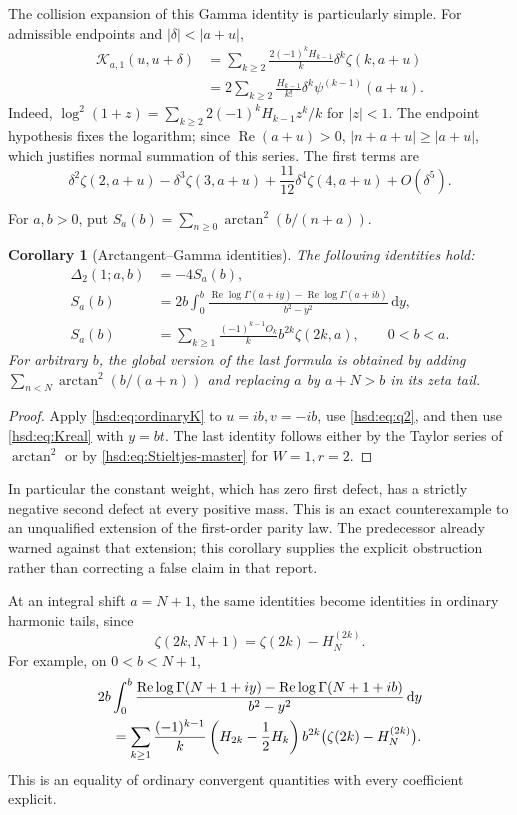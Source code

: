 \documentclass[11pt]{article}
\numberwithin{equation}{section}
\newtheorem{corollary}[theorem]{Corollary}
\theoremstyle{definition}\newtheorem{definition}[theorem]{Definition}
\theoremstyle{remark}\newtheorem{remark}[theorem]{Remark}
\DeclareMathOperator{\Rea}{Re}
\newcommand{\dd}{\,\mathrm d}
\newcommand{\KK}{\mathcal K}
\begin{document}
The collision expansion of this Gamma identity is particularly simple.
For admissible endpoints and $|\delta|<|a+u|$,
\begin{align}
 \KK_{a,1}(u,u+\delta)
 &=\sum_{k\ge2}\frac{2(-1)^kH_{k-1}}k\delta^k\zeta(k,a+u)
 \label{hsd:eq:scalar-collision-zeta}\\
 &=2\sum_{k\ge2}\frac{H_{k-1}}{k!}\delta^k\psi^{(k-1)}(a+u).
 \label{hsd:eq:scalar-collision-psi}
\end{align}
Indeed,
$\log^2(1+z)=\sum_{k\ge2}2(-1)^kH_{k-1}z^k/k$ for $|z|<1$.
The endpoint hypothesis fixes the logarithm; since $\Rea(a+u)>0$,
$|n+a+u|\ge|a+u|$, which justifies normal summation of this series.
The first terms are
\[
 \delta^2\zeta(2,a+u)-\delta^3\zeta(3,a+u)
                     +\frac{11}{12}\delta^4\zeta(4,a+u)+O(\delta^5).
\]

For $a,b>0$, put $S_a(b)=\sum_{n\ge0}\arctan^2(b/(n+a))$.
\begin{corollary}[Arctangent--Gamma identities]
\label{hsd:cor:atan}
The following identities hold:
\begin{align}
 \Delta_2(1;a,b)&=-4S_a(b),\label{hsd:eq:scalar-defect}\\
 S_a(b)&=2b\int_0^b
 \frac{\Rea\log\Gamma(a+iy)-\Rea\log\Gamma(a+ib)}{b^2-y^2}\dd y,
 \label{hsd:eq:atan-gamma}\\
 S_a(b)&=\sum_{k\ge1}\frac{(-1)^{k-1}O_k}{k}
                         b^{2k}\zeta(2k,a),\qquad 0<b<a.
 \label{hsd:eq:atan-harmonic}
\end{align}
For arbitrary $b$, the global version of the last formula is obtained by
adding $\sum_{n<N}\arctan^2(b/(a+n))$ and replacing $a$ by $a+N>b$
in its zeta tail.
\end{corollary}
\begin{proof}
Apply \eqref{hsd:eq:ordinaryK} to $u=ib,v=-ib$, use
\eqref{hsd:eq:q2}, and then use \eqref{hsd:eq:Kreal} with $y=bt$.
The last identity follows either by the Taylor series of $\arctan^2$
or by \eqref{hsd:eq:Stieltjes-master} for $W=1,r=2$.
\end{proof}

In particular the constant weight, which has zero first defect, has a
strictly negative second defect at every positive mass. This is an exact
counterexample to an unqualified extension of the first-order parity law.
The predecessor already warned against that extension; this corollary
supplies the explicit obstruction rather than correcting a false claim
in that report.

At an integral shift $a=N+1$, the same identities become identities in
ordinary harmonic tails, since
\[
 \zeta(2k,N+1)=\zeta(2k)-H_N^{(2k)}.
\]
For example, on $0<b<N+1$,
\begin{align}
 &2b\int_0^b\frac{\Rea\log\Gamma(N+1+iy)
              -\Rea\log\Gamma(N+1+ib)}{b^2-y^2}\dd y\notag\\
 &\quad=\sum_{k\ge1}\frac{(-1)^{k-1}}k
  \left(H_{2k}-\frac12H_k\right)b^{2k}
                     \bigl(\zeta(2k)-H_N^{(2k)}\bigr).
 \label{hsd:eq:explicit-tail-Gamma}
\end{align}
This is an equality of ordinary convergent quantities with every
coefficient explicit.
\end{document}
